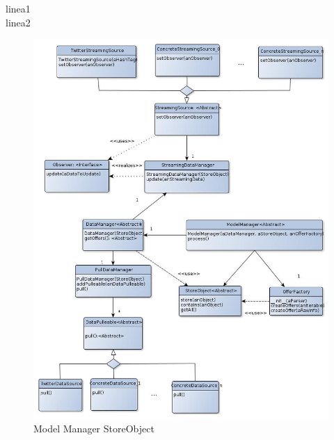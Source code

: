 \documentclass[10pt, a4paper]{article}
\begin{document}
\newpage
linea1\\
linea2\\
\begin{figure}[H]
\centering
\includegraphics[scale=0.6]{graphics/model_manager_storeObject_class.jpg}
\caption{Model Manager StoreObject}
\end{figure}
\end{document}
